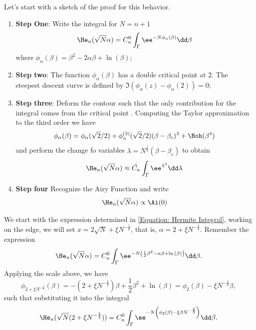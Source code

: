 {Let's start with a sketch of the proof for this behavior.
\begin{enumerate}
	\item \textbf{Step One}: Write the integral for $N = n + 1$
	\begin{equation}
		\He_n(\sqrt{N}\alpha) = C_n^0 \int_{\Gamma}  \ee^{-N \phi_\alpha(\beta) } \dd \beta
	\end{equation} 
	where $\phi_\alpha(\beta) = \beta^2 -2 \alpha \beta + \ln{(\beta)}$;
	\item \textbf{Step two}: The function $\phi_{\alpha}(\beta)$ has a double critical point at $2$. The steepest descent curve is defined by $\Im(\phi_{\alpha}(z) - \phi_{\alpha}(2)) = 0$;
	\item \textbf{Step three}: Deform the contour such that the only contribution for the integral comes from the critical point . Computing the Taylor approximation to the third order we have
	\begin{equation}
		\phi_{\alpha}(\beta) = \phi_\alpha(\sqrt{2}/2) + \phi^{(3)}_\alpha(\sqrt{2}/2) (\beta - \beta_c)^3 + \Boh(\beta^4)  
	\end{equation}
	and perform the change fo variables $\lambda = N^{\frac{1}{3}}(\beta-\beta_c)$ to obtain
	\begin{equation}
		\He_n(\sqrt{N}\alpha) \approx \tilde{C_n} \int_{\Gamma}  \ee^{\lambda^3} \dd \lambda
	\end{equation} 
	\item \textbf{Step four} Recognize the Airy Function and write
	\begin{equation}
		\He_n(\sqrt{N}\alpha) \propto \Ai(0)
	\end{equation}
\end{enumerate}

We start with the expression determined in \eqref{Equation: Hermite Integral}, working on the edge, we will set $x = 2\sqrt{N} + \xi N^{-\frac{1}{6}}$, that is, $\alpha = 2 + \xi N^{-\frac{2}{3}}$. Remember the expression
\begin{equation}
	\He_n(\sqrt{N}\alpha) = C_n^0 \int_{\Gamma}  \ee^{-N \left( \frac{1}{2} \beta^2 - \alpha \beta + \ln{(\beta)} \right) } \dd \beta.
\end{equation}
Applying the scale above, we have
\begin{equation}
	\phi_{2 + \xi N^{-\frac{2}{3}}}(\beta) = -(2 + \xi N^{-\frac{2}{3}})\beta + \frac{1}{2} \beta^2 + \ln(\beta) = \phi_{2}(\beta) - \xi N^{-\frac{2}{3}} \beta,
\end{equation}
such that substituting it into the integral
\begin{equation}
	\He_n(\sqrt{N}(2 + \xi N^{-\frac{2}{3}})) = C_n^0 \int_{\Gamma}  \ee^{-N \left( \phi_{2}(\beta) - \xi \beta N^{-\frac{2}{3}} \right) } \dd \beta.
\end{equation}

}
